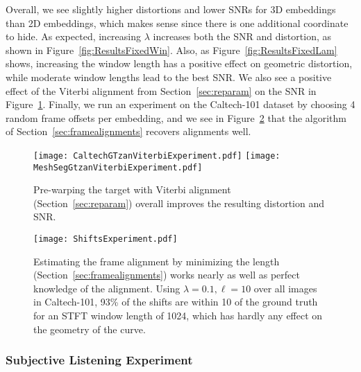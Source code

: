 \documentclass[runningheads]{llncs}
\begin{document}
Overall, we see slightly higher distortions and lower SNRs for 3D embeddings than 2D embeddings, which makes sense since there is one additional coordinate to hide.  As expected, increasing $\lambda$ increases both the SNR and distortion, as shown in Figure~\ref{fig:ResultsFixedWin}. Also, as Figure~\ref{fig:ResultsFixedLam} shows, increasing the window length has a positive effect on geometric distortion, while moderate window lengths lead to the best SNR.  We also see a positive effect of the Viterbi alignment from Section~\ref{sec:reparam} on the SNR in Figure~\ref{fig:ResultsViterbiExperiment}.  Finally, we run an experiment on the Caltech-101 dataset by choosing 4 random frame offsets per embedding, and we see in Figure~\ref{fig:ShiftsExperiment} that the algorithm of Section~\ref{sec:framealignments} recovers alignments well.  


\begin{figure}
  \centering
  \texttt{[image: CaltechGTzanViterbiExperiment.pdf]}
  \texttt{[image: MeshSegGtzanViterbiExperiment.pdf]}
  \caption{Pre-warping the target with Viterbi alignment (Section~\ref{sec:reparam}) overall improves the resulting distortion and SNR.}
  \label{fig:ResultsViterbiExperiment}
\end{figure}

\begin{figure}
  \centering
  \texttt{[image: ShiftsExperiment.pdf]}
  \caption{Estimating the frame alignment by minimizing the length (Section~\ref{sec:framealignments}) works nearly as well as perfect knowledge of the alignment. Using $\lambda=0.1, \ell=10$ over all images in Caltech-101, 93\% of the shifts are within 10 of the ground truth for an STFT window length of 1024, which has hardly any effect on the geometry of the curve.}
  \label{fig:ShiftsExperiment}
\end{figure}

\subsubsection{Subjective Listening Experiment}
\end{document}

